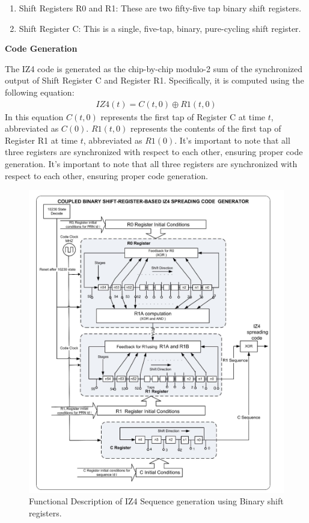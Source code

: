 \begin{enumerate}
    \item {Shift Registers R0 and R1:} These are two fifty-five tap binary shift registers.
    \item {Shift Register C:} This is a single, five-tap, binary, pure-cycling shift register.
\end{enumerate}

\textbf{Code Generation}

\noindent The IZ4 code is generated as the chip-by-chip modulo-2 sum of the synchronized output of Shift Register C and Register R1. Specifically, it is computed using the following equation:
\begin{align}
IZ4(t) = C(t, 0) \oplus R1(t, 0)
\label{eq:iz4} 
\end{align}
\noindent In this equation $C(t, 0)$ represents the first tap of Register C at time $t$, abbreviated as $C(0)$.
$R1(t, 0)$ represents the contents of the first tap of Register R1 at time $t$, abbreviated as $R1(0)$.
It's important to note that all three registers are synchronized with respect to each other, ensuring proper code generation.
It's important to note that all three registers are synchronized with respect to each other, ensuring proper code generation.

\begin{figure}[ht]
\centering
\includegraphics[width=0.8\columnwidth]{figs/IZ4_BCH.png}
\centering
\captionsetup{justification=centering}
\caption{Functional Description of IZ4 Sequence generation using Binary shift registers.}
\label{fig:IZ4_BCH}
\end{figure}

